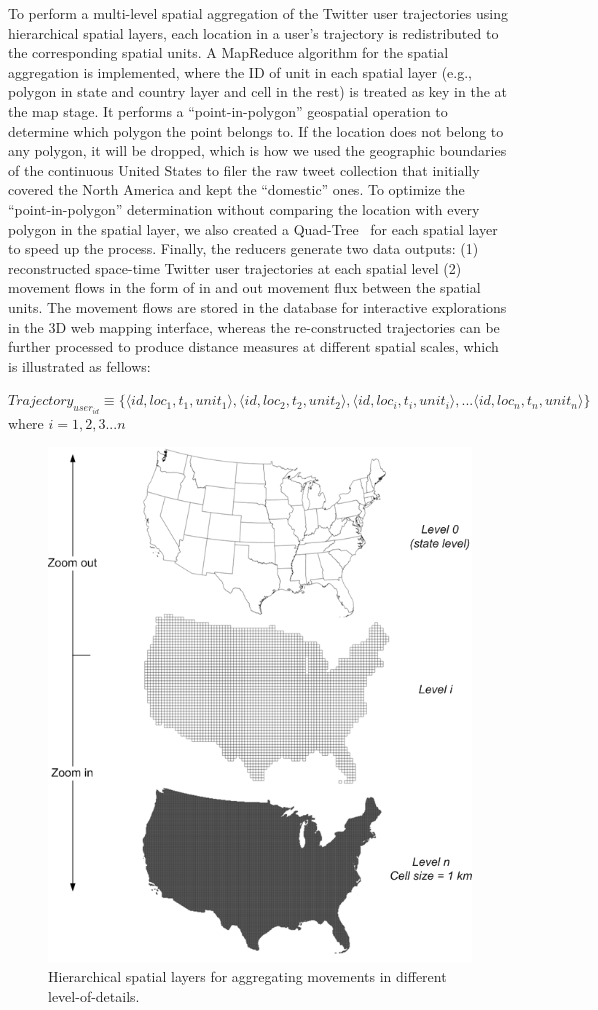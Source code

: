 \documentclass[ijgi,article,accept,moreauthors,pdftex,10pt,a4paper]{mdpi}
\theoremstyle{mdpi}
\newcounter{thm}
\newcounter{ex}
\newcounter{re}
\theoremstyle{mdpidefinition}
\begin{document}
To perform a multi-level spatial aggregation of the Twitter user trajectories using hierarchical spatial layers, each location in a user's trajectory is redistributed to the corresponding spatial units.
A MapReduce algorithm for the spatial aggregation is implemented, where the ID of unit in each spatial layer (e.g., polygon in state and country layer and cell in the rest) is treated as key in the at the map stage.
It performs a ``point-in-polygon'' geospatial operation to determine which polygon the point belongs to.
If the location does not belong to any polygon, it will be dropped, which is how we used the geographic boundaries of the continuous United States to filer the raw tweet collection that initially covered the North America and kept the ``domestic'' ones.
To optimize the ``point-in-polygon'' determination without comparing the location with every polygon in the spatial layer, we also created a Quad-Tree~\cite{samet1984quadtree} for each spatial layer to speed up the process.
Finally, the reducers generate two data outputs: (1) reconstructed space-time Twitter user trajectories at each spatial level (2) movement flows in the form of in and out movement flux between the spatial units.
The movement flows are stored in the database for interactive explorations in the 3D web mapping interface, whereas the re-constructed trajectories can be further processed to produce distance measures at different spatial scales, which is illustrated as fellows:
\newline

\noindent $Trajectory_{user_{id}} \equiv \lbrace \langle id, loc_{1}, t_{1}, unit_{1}\rangle, \langle id, loc_{2}, t_{2}, unit_{2}\rangle, \langle id, loc_{i}, t_{i}, unit_{i}\rangle, ... \langle id, loc_{n}, t_{n}, unit_{n}\rangle \rbrace$
where $ i = 1, 2, 3...n$

\begin{figure}[ht]
\centering
\includegraphics[width=0.6\linewidth]{./figures/multilevel}
\caption{Hierarchical spatial layers for aggregating movements in different level-of-details.}
\label{fig:multilevel}
\end{figure}
\FloatBarrier
\end{document}
